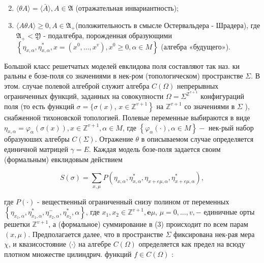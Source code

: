 \documentclass[10pt]{article}
\begin{document}
\begin{enumerate}

  \setcounter{enumi}{1}

  \item $\langle\theta A\rangle=\langle\bar{A}\rangle, A \in \mathfrak{A}$ (отражательная инвариантность);



  \item $\langle A \theta A\rangle \geqslant 0, A \in \mathfrak{A}_{+}$(положительность в смысле Остервальдера - Шрадера), где $\mathfrak{A}_{+}<\mathfrak{Y}$ - подалгебра, порожденная образующими $\left\{\eta_{x, \alpha}, \eta_{x, \alpha}^{*}, x=\left(x^{0}, \ldots, x^{v}\right), x^{0} \geqslant 0, \alpha \in M\right\}$ (алгебра «будущего»).



\end{enumerate}



Большой класс решетчатых моделей евклидова поля составляют так наз. ки ральны е бозе-поля со значениями в нек-ром (топологическом) пространстве $\Sigma$. В этом. случае полевой алгеброй служит алгебра $C(\Omega)$ непрерывных ограниченных функций, заданных на совокупности $\Omega=\Sigma^{\mathbb{Z}^{v+1}}$ конфигураций поля (то есть функций $\sigma=\{\sigma(x)$, $\left.x \in \mathbb{Z}^{v+1}\right\}$ на $\mathbb{Z}^{v+1}$ со значениями в $\Sigma$ ), снабженной тихоновской топологией. Полевые переменные выбираются в виде $\eta_{x, \alpha}=\varphi_{\alpha}(\sigma(x)), x \in \mathbb{Z}^{v+1}, \alpha \in M$, где $\left\{\varphi_{\alpha}(\cdot), \alpha \in M\right\}-$ нек-рый набор образуюших алгебры $C(\Sigma)$. Отражение $\theta$ в описываемом случае определяется единичной матрицей $\gamma=E$. Каждая модель бозе-поля задается своим (формальным) евклидовым действием



\[

S(\sigma)=\sum_{x, \mu} P\left(\eta_{x, \alpha}, \eta_{x, \alpha}^{*}, \eta_{x+e \mu, \alpha}, \eta_{x+e \mu, \alpha}^{*}\right),

\]



где $P(\cdot)$ - вещественный ограниченный снизу полином от переменных $\left\{\eta_{x_{1}, \alpha}, \eta_{x_{1}, \alpha}^{*}, \eta_{x_{2}, \alpha}^{-}, \eta_{x_{2}}^{*}, \alpha\right\}$, где $x_{1}, x_{2} \in \mathbb{Z}^{v+1}, \boldsymbol{e} \mu$, $\mu=0, \ldots, v,-$ единичные орты решетки $\mathbb{Z}^{v+1}$, а (формальное) суммирование в (3) происходит по всем парам $(x, \mu)$. Предполагается далее, что в пространстве $\Sigma$ фиксирована нек-рая мера $\chi$, и квазисостояние $\langle\cdot\rangle$ на алгебре $C(\Omega)$ определяется как предел на всюду плотном множестве цилиндрич. функций $f \in C(\Omega)$ :
\end{document}
